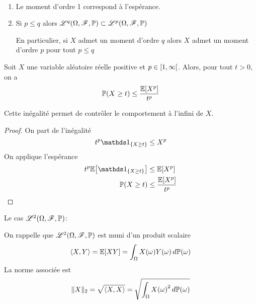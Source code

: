 \begin{remark}\,
    \begin{enumerate}
        \item Le moment d'ordre 1 correspond à l'espérance.

        \item Si \(p\leq q\) alors \(\mathscr{L}^q(\Omega, \mathscr{F}, \mathbb{P})\subset \mathscr{L}^p(\Omega, \mathscr{F}, \mathbb{P})\)

        En particulier, si \(X\) admet un moment d'ordre \(q\) alors \(X\) admet un moment
        d'ordre \(p\) pour tout \(p\leq q\)
    \end{enumerate}
\end{remark}

\begin{proposition}
    Soit \(X\) une variable aléatoire réelle positive et
    \(p\in\mathopen{}\left[1,\infty\right[\mathclose{}\). Alors, pour tout \(t> 0\), on a
    \begin{equation*}
        \mathbb{P}(X\geq t) \leq \frac{\mathbb{E}\mathopen{}\left[X^p\right]\mathclose{}}{t^p}
    \end{equation*}

    Cette inégalité permet de contrôler le comportement à l'infini
    de \(X\).
\end{proposition}

\begin{proof}
    On part de l'inégalité
    \begin{equation*}
        t^p\one_{\{X\geq t\}}\leq X^p
    \end{equation*}
    On applique l'espérance
    \begin{equation*}
        \begin{aligned}
            t^p\bb E\ff{\one_{\{X\geq t\}}} &\leq \bb E\ff{X^p}\\
            \bb P(X\geq t)&\leq \frac{\bb E\ff{X^p}}{t^p}
        \end{aligned}
    \end{equation*}
\end{proof}


Le cas \(\mathscr{L}^2(\Omega, \mathscr{F}, \mathbb{P})\):

On rappelle que \(\mathscr{L}^2(\Omega, \mathscr{F}, \mathbb{P})\) est muni d'un
produit scalaire
\begin{equation*}
    \langle X,Y\rangle = \mathbb{E}\mathopen{}\left[XY\right]\mathclose{} = \int_{\Omega} X(\omega)Y(\omega)\mathop{}\!{d}\mathbb{P}(\omega)
\end{equation*}
La norme associée est
\begin{equation*}
    \mathopen{}\left\|X\right\|\mathclose{}_2 = \sqrt{\langle X, X\rangle} = \sqrt{\int_{\Omega}{X(\omega)}^2\mathop{}\!{d}\mathbb{P}(\omega)}
\end{equation*}


